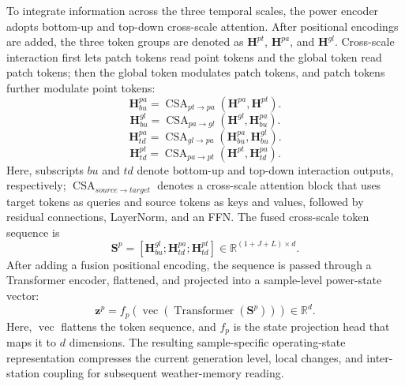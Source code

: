 To integrate information across the three temporal scales, the power encoder adopts bottom-up and top-down cross-scale attention. After positional encodings are added, the three token groups are denoted as \(\mathbf{H}^{pt}\), \(\mathbf{H}^{pa}\), and \(\mathbf{H}^{gl}\). Cross-scale interaction first lets patch tokens read point tokens and the global token read patch tokens; then the global token modulates patch tokens, and patch tokens further modulate point tokens:
\begin{equation}
\mathbf{H}^{pa}_{bu}=\operatorname{CSA}_{pt\rightarrow pa}
(\mathbf{H}^{pa},\mathbf{H}^{pt}).
\end{equation}
\begin{equation}
\mathbf{H}^{gl}_{bu}=\operatorname{CSA}_{pa\rightarrow gl}
(\mathbf{H}^{gl},\mathbf{H}^{pa}_{bu}).
\end{equation}
\begin{equation}
\mathbf{H}^{pa}_{td}=\operatorname{CSA}_{gl\rightarrow pa}
(\mathbf{H}^{pa}_{bu},\mathbf{H}^{gl}_{bu}).
\end{equation}
\begin{equation}
\mathbf{H}^{pt}_{td}=\operatorname{CSA}_{pa\rightarrow pt}
(\mathbf{H}^{pt},\mathbf{H}^{pa}_{td}).
\end{equation}
Here, subscripts \(bu\) and \(td\) denote bottom-up and top-down interaction outputs, respectively; \(\operatorname{CSA}_{source\rightarrow target}\) denotes a cross-scale attention block that uses target tokens as queries and source tokens as keys and values, followed by residual connections, LayerNorm, and an FFN. The fused cross-scale token sequence is
\begin{equation}
\mathbf{S}^{p}=[\mathbf{H}^{gl}_{bu};\mathbf{H}^{pa}_{td};\mathbf{H}^{pt}_{td}]
\in\mathbb{R}^{(1+J+L)\times d}.
\end{equation}
After adding a fusion positional encoding, the sequence is passed through a Transformer encoder, flattened, and projected into a sample-level power-state vector:
\begin{equation}
\mathbf{z}^{p}=f_{p}(\operatorname{vec}(\operatorname{Transformer}(\mathbf{S}^{p})))
\in\mathbb{R}^{d}.
\end{equation}
Here, \(\operatorname{vec}\) flattens the token sequence, and \(f_p\) is the state projection head that maps it to \(d\) dimensions. The resulting sample-specific operating-state representation compresses the current generation level, local changes, and inter-station coupling for subsequent weather-memory reading.

